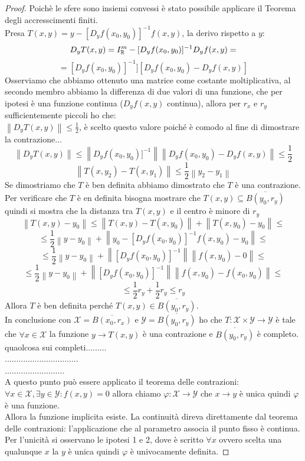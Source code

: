 \begin{proof}
	Poichè le sfere sono insiemi convessi è stato possibile applicare il Teorema degli accresscimenti finiti.\\
	Presa $T(x,y) = y-[D_yf(x_0,y_0)]^{-1}f(x,y)$, la derivo rispetto a $y$:
	$$D_yT(x,y)= I_{\mathbb{R}}^m-[D_yf(x_0,y_0)]^{-1}D_yf(x,y) = $$
	$$=[D_yf(x_0,y_0)]^{-1}][D_yf(x_0,y_0)-D_yf(x,y)]$$
	Osserviamo che abbiamo ottenuto una matrice come costante moltiplicativa, al secondo membro abbiamo la differenza di due valori di una funzione, che per ipotesi è una funzione continua ($D_yf(x,y)$ continua), allora per $r_x$ e $r_y$ sufficientemente piccoli ho che:\\
	$\left\| D_yT(x,y) \right\| \le \frac{1}{2}$, è scelto questo valore poiché è comodo al fine di dimostrare la contrazione...\\
	$$\left\| D_yT(x,y)\right\| \le \left\| D_yf(x_0,y_0)]^{-1}\right\| \left\| D_yf(x_0,y_0)-D_yf(x,y)\right\|\le\frac{1}{2} $$  
	$$\left\| T(x,y_2)-T(x,y_1)\right\|\le\frac{1}{2}\left\|y_2-y_1\right\| $$
	Se dimostriamo che $T$ è ben definita abbiamo dimostrato che $T$ è una contrazione.\\
	Per verificare che $T$ è en definita bisogna mostrare che $T(x,y)\subseteq\overline{B(y_0,r_y)}$ quindi si mostra che la distanza tra $T(x,y)$ e il centro è minore di $r_y$
	$$\left\| T(x,y) - y_0\right\|\le\left\| T(x,y)-T(x,y_0)\right\|+\left\|T(x,y_0)-y_0\right\| \le$$
	$$\le\frac{1}{2}\left\|y-y_0\right\|+\left\|y_0-[D_yf(x_0,y_0)]^{-1}f(x,y_0)-y_0\right\|\le$$
	$$\le\frac{1}{2}\left\|y-y_0\right\|+\left\|[D_yf(x_0,y_0)]^{-1}\right\| \left\|f(x,y_0)-0\right\|\le$$
	$$\le\frac{1}{2}\left\|y-y_0\right\|+\left\|[D_yf(x_0,y_0)]^{-1}\right\| \left\|f(x,y_0)-f(x_0,y_0)\right\|\le$$
	$$\le\frac{1}{2}r_y+\frac{1}{2}r_y\le r_y$$
	Allora $T$ è ben definita perché $T(x,y)\in\overline{B(y_0,r_y)}$.\\
	In conclusione con $\mathcal{X}=\overline{B(x_0,r_x)}$ e $\mathcal{Y}=\overline{B(y_0,r_y)}$ ho che $T:\mathcal{X}\times\mathcal{Y}\rightarrow\mathcal{Y}$ è tale che $\forall x\in\mathcal{X}$ la funzione $y\rightarrow T(x,y)$ è una contrazione e $\overline{B(y_0,r_y)}$ è completo.\\
	quaolcosa sui completi.........\\
	................................\\
	..........................\\
	A questo punto può essere applicato il teorema delle contrazioni:\\
	$\forall x \in \mathcal{X}, \exists y \in\mathcal{Y}: f(x,y)=0$ allora chiamo $\varphi:\mathcal{X}\rightarrow\mathcal{Y}$ che $x\rightarrow y$ è unica quindi $\varphi$ è una funzione.\\
	Allora la funzione implicita esiste. La continuità direva direttamente dal teorema delle contrazioni: l'applicazione che al parametro associa il punto fisso è continua.\\
	Per l'unicità si osservano le ipotesi 1 e 2, dove è scritto $\forall x$ ovvero scelta una qualunque $x$ la $y$ è unica quindi $\varphi$ è univocamente definita.
	  
\end{proof}
